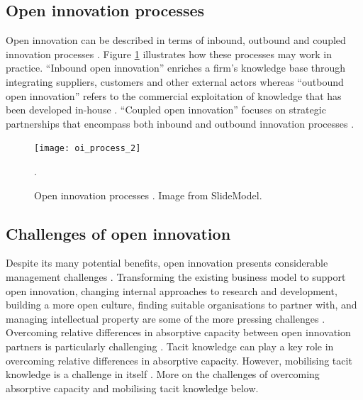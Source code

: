 \subsection{Open innovation processes}

Open innovation can be described in terms of inbound, outbound and coupled innovation processes \citep{chesbrough2006beyond,enkel2009open,gassmann2010future}. Figure \ref{fig:oi_process} illustrates how these processes may work in practice. \enquote{Inbound open innovation} enriches a firm’s knowledge base through integrating suppliers, customers and other external actors \citep{xu2013inbound} whereas \enquote{outbound open innovation} refers to the commercial exploitation of knowledge that has been developed in-house \citep{de2016knowledge}. \enquote{Coupled open innovation} focuses on strategic partnerships that encompass both inbound and outbound innovation processes \citep{spithoven2013open}. \medskip

\begin{figure}
	\centering
	\texttt{[image: oi\_process\_2]}
	\caption{Open innovation processes \citep{chesbrough2004open}. Image from SlideModel\texttrademark.}.
	\label{fig:oi_process}
\end{figure}

\subsection{Challenges of open innovation}

Despite its many potential benefits, open innovation presents considerable management challenges \citep{hossain2013open,vanhaverbeke2014surfing}. Transforming the existing business model to support open innovation, changing internal approaches to research and development, building a more open culture, finding suitable organisations to partner with, and managing intellectual property are some of the more pressing challenges \citep{dahlander2010open,sieg2010managerial,lichtenthaler2011your,durst2013success,roper2013externalities,aloini2016structured}. Overcoming relative differences in absorptive capacity between open innovation partners is particularly challenging \citep{vanhaverbeke2007connecting,lakemond2016match}. Tacit knowledge can play a key role in overcoming relative differences in absorptive capacity. However, mobilising tacit knowledge is a challenge in itself \citep{gassmann2004towards,bahemia2010contingent,bogers2011open}. More on the challenges of overcoming absorptive capacity and mobilising tacit knowledge below. \medskip

